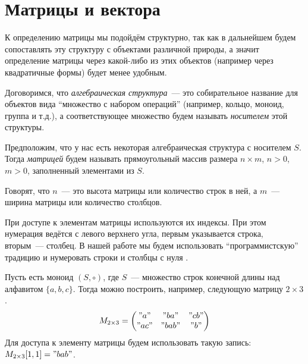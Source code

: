 \section{Матрицы и вектора}
\label{sec:MatricesAndVectors}

К определению матрицы мы подойдём структурно, так как в дальнейшем будем сопоставлять эту структуру с объектами различной природы, а значит определение матрицы через какой-либо из этих объектов (например через квадратичные формы) будет менее удобным.

Договоримся, что \emph{алгебраическая структура}~--- это собирательное название для объектов вида \enquote{множество с набором операций} (например, кольцо, моноид, группа и т.д.), а соответствующее множество будем называть \emph{носителем} этой структуры.

\begin{definition}[Матрица]
    Предположим, что у нас есть некоторая алгебраическая структура с носителем $S$. Тогда \emph{матрицей} будем называть прямоугольный массив размера $n \times m$, $n > 0$, $m > 0$, заполненный элементами из $S$.

    Говорят, что $n$~--- это высота матрицы или количество строк в ней, а $m$~--- ширина матрицы или количество столбцов.
\end{definition}

При доступе к элементам матрицы используются их индексы.
При этом нумерация ведётся с левого верхнего угла, первым указывается строка, вторым~--- столбец.
В нашей работе мы будем использовать \enquote{программистскую} традицию и нумеровать строки и столбцы с нуля%
%
.

\begin{example}
    Пусть есть моноид $(S, \circ)$, где $S$~--- множество строк конечной длины над алфавитом $\{a, b, c\}$.
    Тогда можно построить, например, следующую матрицу $2 \times 3$.
    \[
        M_{2 \times 3} =
        \begin{pmatrix}
            "a"  & "ba"  & "cb" \\
            "ac" & "bab" & "b"
        \end{pmatrix}
    \]
    Для доступа к элементу матрицы будем использовать такую запись: $M_{2 \times 3}[1, 1] = "bab"$.
\end{example}

